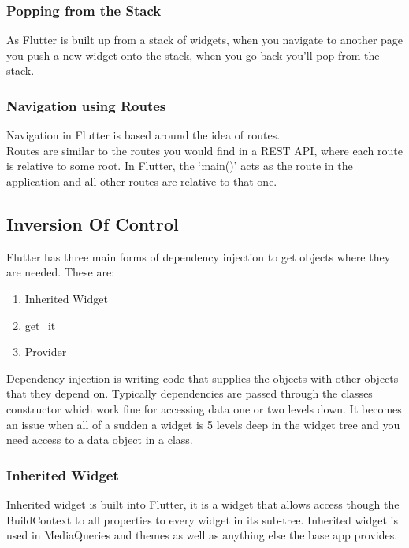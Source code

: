 \subsubsection{Popping from the Stack}
As Flutter is built up from a stack of widgets, when you navigate to another page you push a new widget onto the stack, when you go back you'll pop from the stack. 

\subsubsection{Navigation using Routes}
Navigation in Flutter is based around the idea of routes. 
\\ Routes are similar to the routes you would find in a REST API, where each route is relative to some root. In Flutter, the ‘main()’ acts as the route in the application and all other routes are relative to that one. 

\subsection{Inversion Of Control}
Flutter has three main forms of dependency injection to get objects where they are needed. These are:
\begin{enumerate}
    \item Inherited Widget
    \item get\_it
    \item Provider
\end{enumerate}

Dependency injection is writing code that supplies the objects with other objects that they depend on. Typically dependencies are passed through the classes constructor which work fine for accessing data one or two levels down. It becomes an issue when all of a sudden a widget is 5 levels deep in the widget tree and you need access to a data object in a class. 

\subsubsection{Inherited Widget}
Inherited widget is built into Flutter, it is a widget that allows access though the BuildContext to all properties to every widget in its sub-tree. Inherited widget is used in MediaQueries and themes as well as anything else the base app provides.

